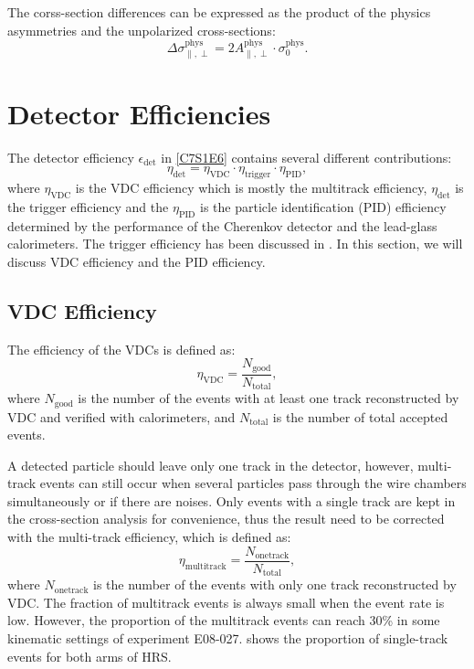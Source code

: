 The corss-section differences can be expressed as the product of the physics asymmetries and the unpolarized cross-sections:
\begin{equation} \label{C7S1E9}
\Delta\sigma_{\parallel,\perp}^{\mathrm{phys}} = 2A_{\parallel,\perp}^{\mathrm{phys}}\cdot\sigma_0^{\mathrm{phys}}.
\end{equation}

\section{Detector Efficiencies}
\label{C7S2}

The detector efficiency $\epsilon_{\mathrm{det}}$ in \cref{C7S1E6} contains several different contributions:
\begin{equation} \label{C7S2E1}
\eta_{\mathrm{det}} = \eta_{\mathrm{VDC}}\cdot\eta_{\mathrm{trigger}}\cdot\eta_{\mathrm{PID}},
\end{equation}
where $\eta_{\mathrm{VDC}}$ is the VDC efficiency which is mostly the multitrack efficiency, $\eta_{\mathrm{det}}$ is the trigger efficiency and the $\eta_{\mathrm{PID}}$ is the particle identification (PID) efficiency determined by the performance of the Cherenkov detector and the lead-glass calorimeters. The trigger efficiency has been discussed in . In this section, we will discuss VDC efficiency and the PID efficiency.

\subsection{VDC Efficiency}
\label{C7S2SS1}

The efficiency of the VDCs is defined as:
\begin{equation} \label{C7S2E2}
\eta_{\mathrm{VDC}} = \frac{N_{\mathrm{good}}}{N_{\mathrm{total}}},
\end{equation}
where $N_{\mathrm{good}}$ is the number of the events with at least one track reconstructed by VDC and verified with calorimeters, and $N_{\mathrm{total}}$ is the number of total accepted events.

A detected particle should leave only one track in the detector, however, multi-track events can still occur when several particles pass through the wire chambers simultaneously or if there are noises. Only events with a single track are kept in the cross-section analysis for convenience, thus the result need to be corrected with the multi-track efficiency, which is defined as:
\begin{equation} \label{C7S2E3}
\eta_{\mathrm{multitrack}} = \frac{N_{\mathrm{onetrack}}}{N_{\mathrm{total}}},
\end{equation}
where $N_{\mathrm{onetrack}}$ is the number of the events with only one track reconstructed by VDC. The fraction of multitrack events is always small when the event rate is low. However, the proportion of the multitrack events can reach 30\% in some kinematic settings of experiment E08-027.  shows the proportion of single-track events for both arms of HRS.

